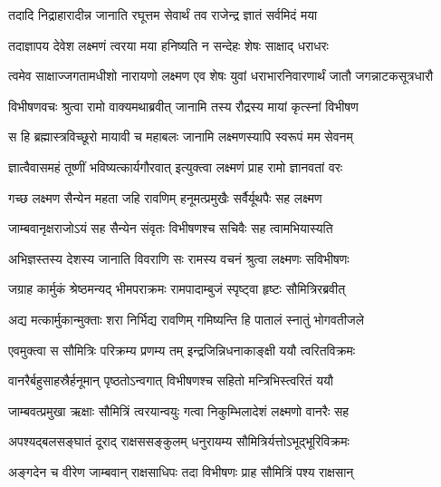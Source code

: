 \twolineshloka
{तदादि निद्राहारादीन्न जानाति रघूत्तम}
{सेवार्थं तव राजेन्द्र ज्ञातं सर्वमिदं मया} %

\twolineshloka
{तदाज्ञापय देवेश लक्ष्मणं त्वरया मया}
{हनिष्यति न सन्देहः शेषः साक्षाद् धराधरः} %

\fourlineindentedshloka
{त्वमेव साक्षाज्जगतामधीशो}
{नारायणो लक्ष्मण एव शेषः}
{युवां धराभारनिवारणार्थं}
{जातौ जगन्नाटकसूत्रधारौ} %






\twolineshloka
{विभीषणवचः श्रुत्वा रामो वाक्यमथाब्रवीत्}
{जानामि तस्य रौद्रस्य मायां कृत्स्नां विभीषण} %

\twolineshloka
{स हि ब्रह्मास्त्रविच्छूरो मायावी च महाबलः}
{जानामि लक्ष्मणस्यापि स्वरूपं मम सेवनम्} %

\twolineshloka
{ज्ञात्वैवासमहं तूष्णीं भविष्यत्कार्यगौरवात्}
{इत्युक्त्वा लक्ष्मणं प्राह रामो ज्ञानवतां वरः} %

\twolineshloka
{गच्छ लक्ष्मण सैन्येन महता जहि रावणिम्}
{हनूमत्प्रमुखैः सर्वैर्यूथपैः सह लक्ष्मण} %

\twolineshloka
{जाम्बवानृक्षराजोऽयं सह सैन्येन संवृतः}
{विभीषणश्च सचिवैः सह त्वामभियास्यति} %

\twolineshloka
{अभिज्ञस्तस्य देशस्य जानाति विवराणि सः}
{रामस्य वचनं श्रुत्वा लक्ष्मणः सविभीषणः} %

\twolineshloka
{जग्राह कार्मुकं श्रेष्ठमन्यद् भीमपराक्रमः}
{रामपादाम्बुजं स्पृष्ट्वा हृष्टः सौमित्रिरब्रवीत्} %

\twolineshloka
{अद्य मत्कार्मुकान्मुक्ताः शरा निर्भिद्य रावणिम्}
{गमिष्यन्ति हि पातालं स्नातुं भोगवतीजले} %

\twolineshloka
{एवमुक्त्वा स सौमित्रिः परिक्रम्य प्रणम्य तम्}
{इन्द्रजिन्निधनाकाङ्क्षी ययौ त्वरितविक्रमः} %

\twolineshloka
{वानरैर्बहुसाहस्रैर्हनूमान् पृष्ठतोऽन्वगात्}
{विभीषणश्च सहितो मन्त्रिभिस्त्वरितं ययौ} %

\twolineshloka
{जाम्बवत्प्रमुखा ऋक्षाः सौमित्रिं त्वरयान्वयुः}
{गत्वा निकुम्भिलादेशं लक्ष्मणो वानरैः सह} %

\twolineshloka
{अपश्यद्बलसङ्घातं दूराद् राक्षससङ्कुलम्}
{धनुरायम्य सौमित्रिर्यत्तोऽभूद्भूरिविक्रमः} %

\twolineshloka
{अङ्गदेन च वीरेण जाम्बवान् राक्षसाधिपः}
{तदा विभीषणः प्राह सौमित्रिं पश्य राक्षसान्} %

